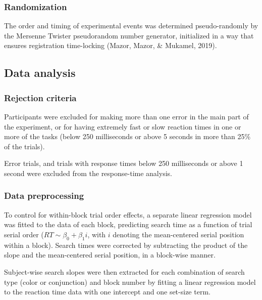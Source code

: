 \documentclass[
  english,
  man]{apa6}
\begin{document}
\hypertarget{randomization}{%
\subsubsection{Randomization}\label{randomization}}

The order and timing of experimental events was determined pseudo-randomly by the Mersenne Twister pseudorandom number generator, initialized in a way that ensures registration time-locking (Mazor, Mazor, \& Mukamel, 2019).

\hypertarget{data-analysis}{%
\subsection{Data analysis}\label{data-analysis}}

\hypertarget{rejection-criteria}{%
\subsubsection{Rejection criteria}\label{rejection-criteria}}

Participants were excluded for making more than one error in the main part of the experiment, or for having extremely fast or slow reaction times in one or more of the tasks (below 250 milliseconds or above 5 seconds in more than 25\% of the trials).

Error trials, and trials with response times below 250 milliseconds or above 1 second were excluded from the response-time analysis.

\hypertarget{data-preprocessing}{%
\subsubsection{Data preprocessing}\label{data-preprocessing}}

To control for within-block trial order effects, a separate linear regression model was fitted to the data of each block, predicting search time as a function of trial serial order (\(RT \sim \beta_0+\beta_1i\), with \(i\) denoting the mean-centered serial position within a block). Search times were corrected by subtracting the product of the slope and the mean-centered serial position, in a block-wise manner.

Subject-wise search slopes were then extracted for each combination of search type (color or conjunction) and block number by fitting a linear regression model to the reaction time data with one intercept and one set-size term.
\end{document}
